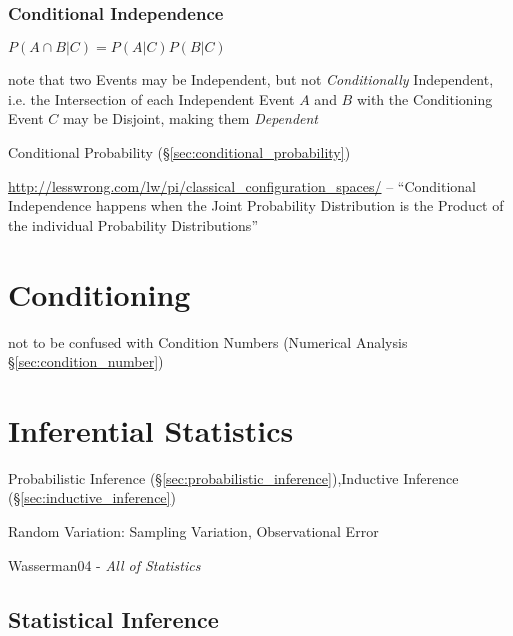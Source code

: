 \subsubsection{Conditional Independence}\label{sec:conditional_independence}

$P(A \cap B | C) = P(A|C)P(B|C)$

note that two Events may be Independent, but not \emph{Conditionally}
Independent, i.e. the Intersection of each Independent Event $A$ and $B$ with
the Conditioning Event $C$ may be Disjoint, making them \emph{Dependent}

\fist Conditional Probability (\S\ref{sec:conditional_probability})

\url{http://lesswrong.com/lw/pi/classical_configuration_spaces/}
-- ``Conditional Independence happens when the Joint Probability Distribution
is the Product of the individual Probability Distributions''



\section{Conditioning}\label{sec:conditioning}

\fist not to be confused with Condition Numbers (Numerical Analysis
\S\ref{sec:condition_number})



\section{Inferential Statistics}\label{sec:inferential_statistics}

Probabilistic Inference
(\S\ref{sec:probabilistic_inference}),Inductive Inference
(\S\ref{sec:inductive_inference})

Random Variation: Sampling Variation, Observational Error

Wasserman04 - \emph{All of Statistics}



\subsection{Statistical Inference}\label{sec:statistical_inference}

